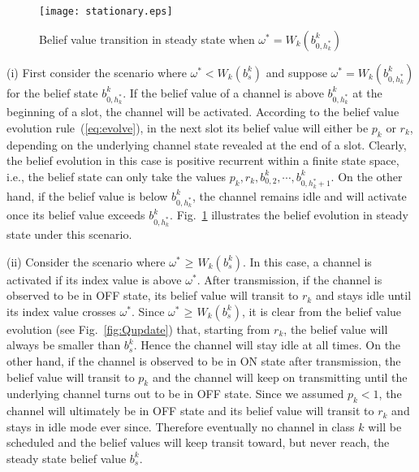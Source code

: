 \documentclass[11pt,twocolumn]{IEEEtran}
\begin{document}
\begin{figure}
\centering
\texttt{[image: stationary.eps]}
\vspace{-4pt}
\caption{Belief value transition in steady state when $\omega^* = W_k(b^k_{0,h^*_k})$}
\vspace{-3pt}
\label{fig:belief_pos}
\end{figure}

(i) First consider the scenario where $\omega^* < W_k(b^k_s)$ and suppose $\omega^* = W_k(b^k_{0,h^*_k})$ for the belief state $b^k_{0,h^*_k}$. If the belief value of a channel is above $b^k_{0,h^*_k}$ at the beginning of a slot, the channel will be activated. According to the belief value evolution rule~(\ref{eq:evolve}), in the next slot its belief value will either be $p_k$ or $r_k$, depending on the underlying channel state revealed at the end of a slot. Clearly, the belief evolution in this case is positive recurrent within a finite state space, i.e., the belief state can only take the values $p_k, r_k, b^k_{0,2}, \cdots, b^k_{0,h^*_k+1}$. On the other hand, if the belief value is below $b^k_{0,h^*_k}$, the channel remains idle and will activate once its belief value exceeds $b^k_{0,h^*_k}$. Fig.~\ref{fig:belief_pos} illustrates the belief evolution in steady state under this scenario.
\vspace{4pt}

(ii) Consider the scenario where $\omega^* \hspace{1pt}{\geq}\hspace{1pt}W_k(b^k_s)$. In this case, a channel is activated if its index value is above $\omega^*$. After transmission, if the channel is observed to be in OFF state, its belief value will transit to $r_k$ and stays idle until its index value crosses $\omega^*$. Since $\omega^* \hspace{1pt}{\geq}\hspace{1pt}W_k(b^k_s)$, it is clear from the belief value evolution (see Fig.~\ref{fig:Qupdate}) that, starting from $r_k$, the belief value will always be smaller than $b^k_s$. Hence the channel will stay idle at all times. On the other hand, if the channel is observed to be in ON state after transmission, the belief value will transit to $p_k$ and the channel will keep on transmitting until the underlying channel turns out to be in OFF state. Since we assumed $p_k<1$, the channel will ultimately be in OFF state and its belief value will transit to $r_k$ and stays in idle mode ever since. Therefore eventually no channel in class $k$ will be scheduled and the belief values will keep transit toward, but never reach, the steady state belief value $b^k_{s}$.
\end{document}
